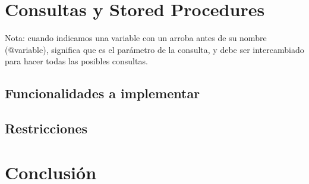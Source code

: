\documentclass[hidelinks,a4paper,11pt, nofootinbib]{article}
\begin{document}
\newpage


\section{Consultas y Stored Procedures}
Nota: cuando indicamos una variable con un arroba antes de su nombre (@variable), significa que es el parámetro de la consulta, y debe ser intercambiado para hacer todas las posibles consultas.

\subsection{Funcionalidades a implementar}

\subsection{Restricciones}

\newpage


\section{Conclusión}

\newpage


%
%
\end{document}

